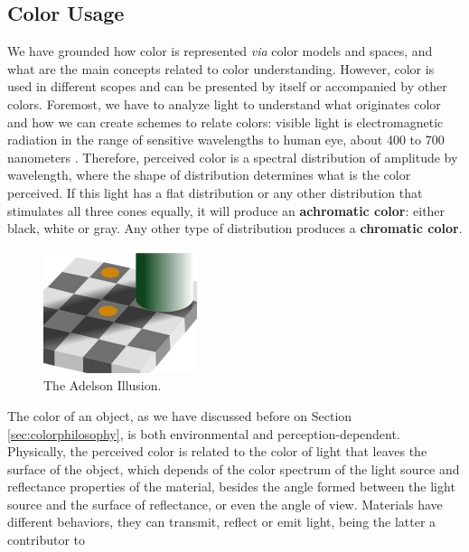 \documentclass{report}
\begin{document}
\subsection{Color Usage}
We have grounded how color is represented \emph{via} color models and spaces, and what are the main concepts
related to color understanding. However, color is used in different scopes and can be presented by itself or
accompanied by other colors. Foremost, we have to analyze light to understand what originates color and how
we can create schemes to relate colors: visible light is electromagnetic radiation in the range of sensitive
wavelengths to human eye, about 400 to 700 nanometers \cite{Joblove1978}. Therefore,
perceived color is a spectral distribution of amplitude by wavelength, where the shape of distribution determines
what is the color perceived. If this light has a flat distribution or any other distribution that stimulates all
three cones equally, it will produce an \textbf{achromatic color}: either black, white or gray. Any other type of
distribution produces a \textbf{chromatic color}. \par
%
\begin{figure}
	\centering
    \vspace{-\baselineskip}
    \includegraphics[width=0.4\textwidth]{Adelson_Illusion.jpg}
    \caption[Adelson Illusion]{The Adelson Illusion.\protect\footnotemark{}}
    \label{fig:adelson}
\end{figure}
%
The color of an object, as we have discussed before on Section \ref{sec:colorphilosophy}, is both environmental and
perception-dependent. Physically, the perceived color is related to the color of light that leaves the surface
of the object, which depends of the color spectrum of the light source and reflectance properties of the material,
besides the angle formed between the light source and the surface of reflectance, or even the angle of view.
Materials have different behaviors, they can transmit, reflect or emit light, being the latter a contributor to
\end{document}
